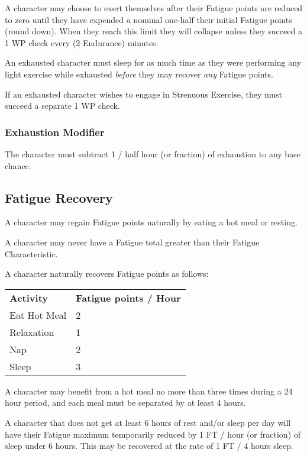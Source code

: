 \begin{multicols*}{3}
A character may choose to exert themselves after their Fatigue points
are reduced to zero until they have expended a nominal one-half their
initial Fatigue points (round down). When they reach this limit they
will collapse unless they succeed a 1 \x WP check every (2 \x
Endurance) minutes.

An exhausted character must sleep for as much time as they were
performing any light exercise while exhausted \emph{before} they may
recover \emph{any} Fatigue points.

If an exhausted character wishes to engage in Strenuous Exercise, they
must succeed a separate 1 \x WP check.

\subsubsection{Exhaustion Modifier}

The character must subtract 1 / half hour (or fraction) of exhaustion
to any base chance.

\subsection{Fatigue Recovery}

A character may regain Fatigue points naturally by eating a hot meal
or resting.

A character may never have a Fatigue total greater than their Fatigue
Characteristic.

A character naturally recovers Fatigue points as follows:

\begin{tabular}{ll}
\textbf{Activity} & \textbf{Fatigue points / Hour} \\
Eat Hot Meal	& 2 \\
Relaxation 	& 1 \\
Nap		& 2 \\
Sleep		& 3 \\
\end{tabular}

\begin{Enumerate}
\item
A character may benefit from a hot meal no more than three times
during a 24 hour period, and each meal must be separated by at least 4
hours.

\item
A character that does not get at least 6 hours of rest and/or sleep
per day will have their Fatigue maximum temporarily reduced by 1 FT /
hour (or fraction) of sleep under 6 hours. This may be recovered at
the rate of 1 FT / 4 hours sleep.


\end{Enumerate}
\end{multicols*}
